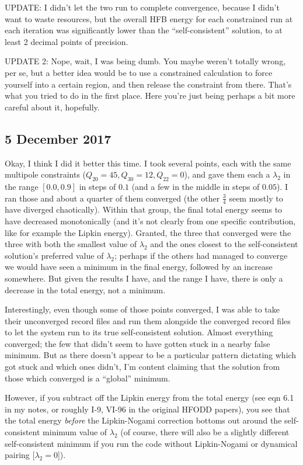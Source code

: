 UPDATE: I didn't let the two run to complete convergence, because I didn't want to waste resources, but the overall HFB energy for each constrained run at each iteration was significantly lower than the ``self-consistent'' solution, to at least 2 decimal points of precision.

UPDATE 2: Nope, wait, I was being dumb. You maybe weren't totally wrong, per se, but a better idea would be to use a constrained calculation to force yourself into a certain region, and then release the constraint from there. That's what you tried to do in the first place. Here you're just being perhaps a bit more careful about it, hopefully.

\subsection*{5 December 2017}
Okay, I think I did it better this time. I took several points, each with the same multipole constraints ($Q_{20}=45, Q_{30}=12, Q_{22}=0$), and gave them each a $\lambda_2$ in the range $[0.0, 0.9]$ in steps of $0.1$ (and a few in the middle in steps of $0.05$). I ran those and about a quarter of them converged (the other $\frac{3}{4}$ seem mostly to have diverged chaotically). Within that group, the final total energy seems to have decreased monotonically (and it's not clearly from one specific contribution, like for example the Lipkin energy). Granted, the three that converged were the three with both the smallest value of $\lambda_2$ and the ones closest to the self-consistent solution's preferred value of $\lambda_2$; perhaps if the others had managed to converge we would have seen a minimum in the final energy, followed by an increase somewhere. But given the results I have, and the range I have, there is only a decrease in the total energy, not a minimum.

Interestingly, even though some of those points converged, I was able to take their unconverged record files and run them alongside the converged record files to let the system run to its true self-consistent solution. Almost everything converged; the few that didn't seem to have gotten stuck in a nearby false minimum. But as there doesn't appear to be a particular pattern dictating which got stuck and which ones didn't, I'm content claiming that the solution from those which converged is a ``global'' minimum.

However, if you subtract off the Lipkin energy from the total energy (see eqn 6.1 in my notes, or roughly I-9, VI-96 in the original HFODD papers), you see that the total energy \textit{before} the Lipkin-Nogami correction bottoms out around the self-consistent minimum value of $\lambda_2$ (of course, there will also be a slightly different self-consistent minimum if you run the code without Lipkin-Nogami or dynamical pairing [$\lambda_2=0$]).

